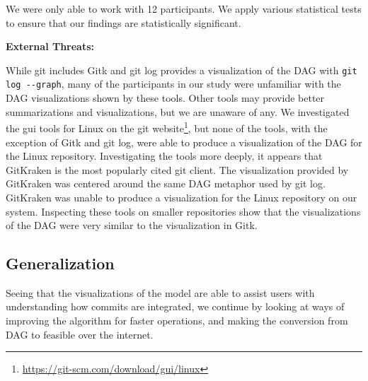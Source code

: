 We were only able to work with 12 participants. We apply various
statistical tests to ensure that our findings are statistically significant.

\textbf{External Threats:}

While git includes Gitk and git log provides a visualization of the DAG
with \verb|git log --graph|, many of the participants in our study were
unfamiliar with the DAG visualizations shown by these tools. Other tools
may provide better summarizations and visualizations, but we are unaware
of any. We investigated the gui tools for Linux on the git
website\footnote{\url{https://git-scm.com/download/gui/linux}}, but none
of the tools, with the exception of Gitk and git log, were able to
produce a visualization of the DAG for the Linux repository.
Investigating the tools more deeply, it appears that GitKraken is the
most popularly cited git client. The visualization provided by GitKraken
was centered around the same DAG metaphor used by git log. GitKraken was
unable to produce a visualization for the Linux repository on our
system. Inspecting these tools on smaller repositories show that the
visualizations of the DAG were very similar to the visualization in
Gitk.





\subsection{Generalization}
\label{sub:generalization}

Seeing that the visualizations of the \mt model are able to assist users
with understanding how commits are integrated, we continue by looking at
ways of improving the algorithm for faster operations, and making the
conversion from DAG to \mt feasible over the internet.

